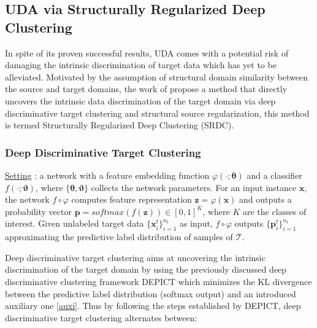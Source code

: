 \documentclass[runningheads]{llncs}
\begin{document}
\subsection*{UDA via Structurally Regularized Deep Clustering}
In spite of its proven successful results, UDA comes with a potential risk of damaging the intrinsic discrimination of target data \cite{2,3,4}
which has yet to be alleviated. Motivated by the assumption of structural domain similarity between the source and target domains, the work of \cite{5} propose a method that directly uncovers the intrinsic data discrimination of the target domain via deep discriminative target clustering and structural source regularization, this method is termed Structurally Regularized Deep Clustering (SRDC).

\subsubsection*{Deep Discriminative Target Clustering} 
\underline{Setting} : a network with a feature embedding function $\varphi(\cdot;\boldsymbol{\theta})$ and a classifier $f(\cdot;\boldsymbol{\vartheta})$, where $\{\boldsymbol{\theta},\boldsymbol{\vartheta}\}$ collects the network parameters. For an input instance $\boldsymbol{x}$, the network $f\circ\varphi$ computes feature representation $\boldsymbol{z} = \varphi(\boldsymbol{x})$ and outputs a probability vector $\boldsymbol{p} = softmax(f(\boldsymbol{z})) \in [0,1]^K$, where $K$ are the classes of interest.
Given unlabeled target data $\{\boldsymbol{x}^t_i\}^{n_t}_{i=1}$ as input, $f \circ \varphi$ outputs $\{\boldsymbol{p}^t_i\}^{n_t}_{i=1}$ approximating the predictive label distribution of samples of $\mathcal{T}$. 

Deep discriminative target clustering aims at uncovering the intrinsic discrimination of the target domain by using the previously discussed deep discriminative clustering framework DEPICT \cite{15} which minimizes the KL divergence between the predictive label distribution (softmax output) and an introduced auxiliary one \eqref{auxi}. Thus by following the steps established by DEPICT, deep discriminative target clustering alternates between:
\end{document}
